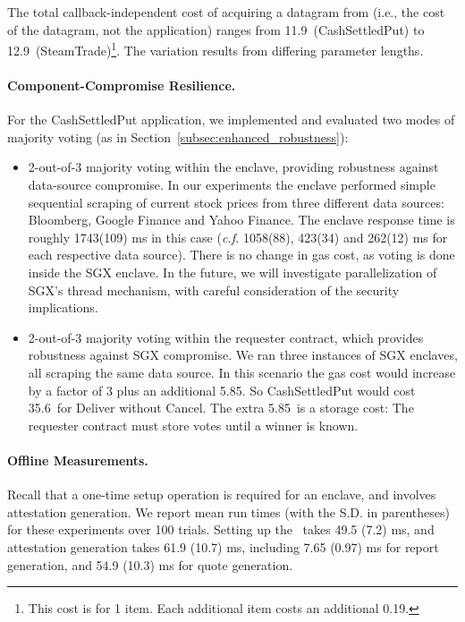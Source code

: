 The total callback-independent cost of acquiring a datagram from \tc (i.e., the cost of the datagram, not the application)
ranges from 11.9\textcent\ ({\sf CashSettledPut}) to 12.9\textcent\ ({\sf SteamTrade})\footnote{This cost is for 1 item. Each additional item costs an additional 0.19\textcent.}.
The variation results from differing parameter lengths.





\paragraph{Component-Compromise Resilience.}
\label{subsec:hedging}
For the {\sf CashSettledPut} application, 
we implemented and evaluated two modes of majority voting (as in Section~\ref{subsec:enhanced_robustness}):
\begin{itemize}[leftmargin=3mm]
  \setlength{\itemsep}{2pt}
  \setlength{\parskip}{0pt}
  \setlength{\parsep}{0pt}
\item
2-out-of-3 majority voting within the enclave, providing robustness
against data-source compromise. 
In our experiments
the enclave performed simple sequential scraping of current stock prices 
from three different data sources: Bloomberg, Google Finance and Yahoo Finance.
The enclave response time is roughly
1743(109) ms in this case ({\it c.f.}  
1058(88), 423(34) and 262(12) ms for 
each respective data source). There is no change in gas cost, as voting is done
inside the SGX enclave.
In the future, we will investigate parallelization of SGX's thread mechanism, with careful consideration of the security implications.


\item
2-out-of-3 majority voting within the requester contract,
which provides robustness against 
SGX compromise.
We ran three instances of SGX enclaves, all scraping
the same data source.  
In this scenario 
the gas cost would increase by a factor of 3 plus an additional 5.85\textcent.
So {\sf CashSettledPut} would cost 35.6\textcent\ for Deliver without Cancel.
The extra 5.85\textcent\ is a storage cost: The requester contract must store votes
until a winner is known.
\end{itemize}


\paragraph{Offline Measurements.}
Recall that a one-time setup operation is required 
for an enclave, and involves attestation generation. We report mean run times (with the S.D. in parentheses) for these experiments over 100 trials.
Setting up the \tc~\encname takes
49.5 (7.2) ms,
and attestation generation takes 
61.9 (10.7) ms, including
7.65 (0.97) ms for report generation, 
and 54.9 (10.3) ms for quote generation.


